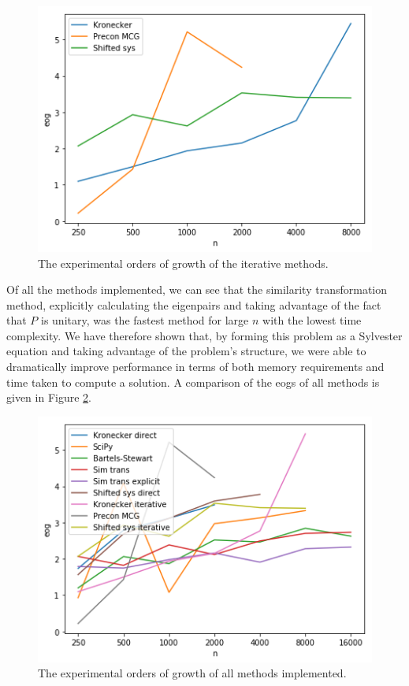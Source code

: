 \documentclass[11pt]{article}
\numberwithin{equation}{section}
\begin{document}
\begin{figure}[H]
\centering
\includegraphics[scale=.6]{img/iterative.png}
\caption{The experimental orders of growth of the iterative methods.}
\label{fig:iterative}
\end{figure}

Of all the methods implemented, we can see that the similarity transformation method, explicitly calculating the eigenpairs and taking advantage of the fact that $P$ is unitary, was the fastest method for large $n$ with the lowest time complexity. We have therefore shown that, by forming this problem as a Sylvester equation and taking advantage of the problem's structure, we were able to dramatically improve performance in terms of both memory requirements and time taken to compute a solution. A comparison of the eogs of all methods is given in Figure \ref{fig:methods}.

\begin{figure}[H]
\centering
\includegraphics[scale=.6]{img/methods.png}
\caption{The experimental orders of growth of all methods implemented.}
\label{fig:methods}
\end{figure}
\end{document}
